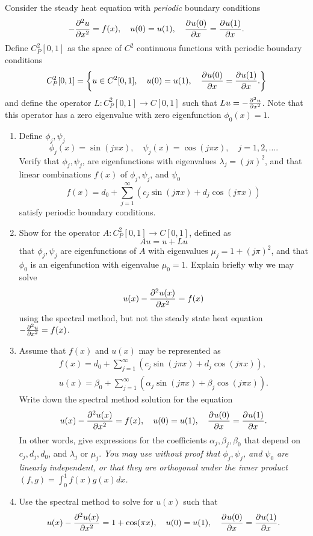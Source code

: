 Consider the steady heat equation with \emph{periodic} boundary conditions
\[
-\frac{\partial^{2} u}{\partial x^{2}} = f(x), \quad u(0) = u(1), \quad \frac{\partial^{} u(0)}{\partial x^{}} = \frac{\partial^{} u(1)}{\partial x^{}}.
\]
Define $C^2_P[0,1]$ as the space of $C^2$ continuous functions with periodic boundary conditions
\[
C^2_P[0,1] = \left\{ 
u\in C^2[0,1], \quad u(0) = u(1), \quad \frac{\partial^{} u(0)}{\partial x^{}} = \frac{\partial^{} u(1)}{\partial x^{}}.
\right\}
\]
and define the operator $L:C^2_P[0,1]\rightarrow C[0,1]$ such that $Lu = -\frac{\partial^{2} u}{\partial x^{2}}$. Note that this operator has a zero eigenvalue with zero eigenfunction $\phi_0(x) = 1$. 

\begin{enumerate}
\item Define $\phi_j, \psi_j$ 
\[
\phi_j(x) = \sin(j\pi x), \quad \psi_j(x) = \cos(j\pi x), \quad j = 1,2,\ldots.
\]
Verify that $\phi_j,\psi_j$, are eigenfunctions with eigenvalues $\lambda_j = (j\pi)^2$, and that linear combinations $f(x)$ of $\phi_j,\psi_j$, and $\psi_0$
\[
f(x) = d_0 + \sum_{j = 1}^\infty \left( c_j \sin(j\pi x) + d_j \cos(j\pi x)\right)
\]
satisfy periodic boundary conditions.
\item Show for the operator $A:C^2_P[0,1]\rightarrow C[0,1]$, defined as
\[
Au = u + Lu
\]
that $\phi_j, \psi_j$ are eigenfunctions of $A$ with eigenvalues $\mu_j = 1 + (j\pi)^2$, and that $\phi_0$ is an eigenfunction with eigenvalue $\mu_0 = 1$.  Explain briefly why we may solve 
\[
u(x) - \frac{\partial^{2} u(x)}{\partial x^{2}} = f(x)
\]
using the spectral method, but not the steady state heat equation $-\frac{\partial^{2} u}{\partial x^{2}} = f(x)$.
\item Assume that $f(x)$ and $u(x)$ may be represented as
\begin{align*}
f(x) = d_0 + \sum_{j = 1}^\infty \left( c_j \sin(j\pi x) + d_j \cos(j\pi x)\right),\\
u(x) = \beta_0 + \sum_{j=1}^\infty \left( \alpha_j \sin(j\pi x) + \beta_j \cos(j\pi x) \right).
\end{align*}
Write down the spectral method solution for the equation
\[
u(x) - \frac{\partial^{2} u(x)}{\partial x^{2}} = f(x), \quad u(0) = u(1), \quad \frac{\partial^{} u(0)}{\partial x^{}} = \frac{\partial^{} u(1)}{\partial x^{}}.
\]
In other words, give expressions for the coefficients $\alpha_j,\beta_j, \beta_0$ that depend on $c_j, d_j, d_0$, and $\lambda_j$ or $\mu_j$.  \emph{You may use without proof that $\phi_j, \psi_j$, and $\psi_0$ are linearly independent, or that they are orthogonal under the inner product $(f,g) = \int_0^1 f(x)g(x) dx$.}
\item Use the spectral method to solve for $u(x)$ such that
\[
u(x) - \frac{\partial^{2} u(x)}{\partial x^{2}} = 1 + \cos(\pi x), \quad u(0) = u(1), \quad \frac{\partial^{} u(0)}{\partial x^{}} = \frac{\partial^{} u(1)}{\partial x^{}}.
\]
\end{enumerate}